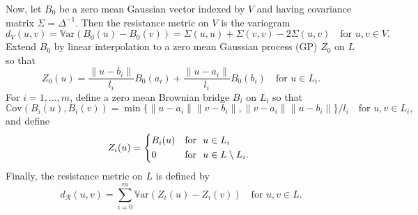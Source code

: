 \documentclass[alpha-refs]{wiley-article}
\begin{document}
Now, let $B_0$ be a zero mean Gaussian vector indexed by $V$ and having covariance matrix $\Sigma=\Delta^{-1}$. Then
the resistance metric on $V$ is the variogram
\begin{equation}
\label{e:d-V}
d_V(u,v)=\mathbb{V}{\mathrm{ar}}(B_0(u)-B_0(v))=\Sigma(u,u)+\Sigma(v,v)-2\Sigma(u,v)\quad\mbox{for } u,v\in V.
\end{equation}
Extend $B_0$ by linear interpolation to a zero mean Gaussian process (GP) $Z_0$ on $L$ so that %
\[Z_0(u)=\frac{\|u-b_i\|}{l_i}B_0(a_i)+\frac{\|u-a_i\|}{l_i}B_0(b_i)\quad\mbox{for }u\in L_i.\]
For $i=1,\ldots,m$, define a zero mean Brownian bridge $B_i$ on $L_i$ so that  %
\[\mathbb{C}{\mathrm{ov}}(B_i(u),B_i(v))=\min\{\|u-a_i\|\|v-b_i\|,\|v-a_i\|\|u-b_i\|\}/l_i\quad\mbox{for $u,v\in L_i$,}
\]
and define
\[Z_i(u)=\begin{cases*}
                    B_i(u) & \text{for } $u\in L_i$  \\
                     0 & \text{for } $u\in L\setminus L_i$.
                 \end{cases*}
                 \]
Finally, the resistance metric on $L$ is defined by %
 \begin{equation}\label{e:def-dR}
 d_{\mathcal{R}}(u,v) %
 =\sum_{i=0}^m \mathbb{V}{\mathrm{ar}}(Z_i(u)-Z_i(v))\quad\mbox{for } u,v\in L.
 \end{equation}
 
\end{document}
